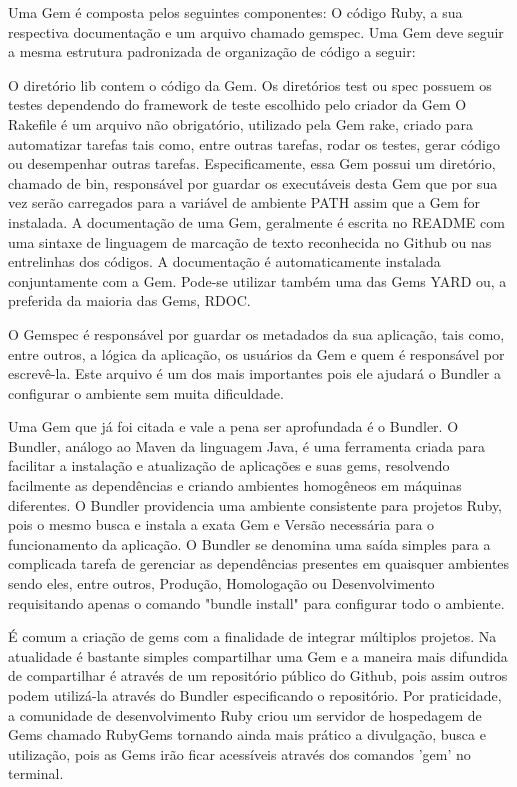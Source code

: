 Uma Gem é composta pelos seguintes componentes: O código Ruby, a sua respectiva documentação e um arquivo chamado gemspec. Uma Gem deve seguir a mesma estrutura padronizada de organização de código a seguir:



O diretório lib contem o código da Gem. Os diretórios test ou spec possuem os testes dependendo do framework de teste escolhido pelo criador da Gem
O Rakefile é um arquivo não obrigatório, utilizado pela Gem rake, criado para automatizar tarefas tais como, entre outras tarefas, rodar os testes, gerar código ou desempenhar outras tarefas. Especificamente, essa Gem possui um diretório, chamado de bin, responsável por guardar os executáveis desta Gem que por sua vez serão carregados para a variável de ambiente PATH assim que a Gem for instalada. A documentação de uma Gem, geralmente é escrita no README com uma sintaxe de linguagem de marcação de texto reconhecida no Github ou nas entrelinhas dos códigos. A documentação é automaticamente instalada conjuntamente com a Gem. Pode-se utilizar também uma das Gems YARD ou, a preferida da maioria das Gems, RDOC.

	O Gemspec é responsável por guardar os metadados da sua aplicação, tais como, entre outros, a lógica da aplicação, os usuários da Gem e quem é responsável por escrevê-la. Este arquivo é um dos mais importantes pois ele ajudará o Bundler a configurar o ambiente sem muita dificuldade.

Uma Gem que já foi citada e vale a pena ser aprofundada é o Bundler. O Bundler, análogo ao Maven da linguagem Java, é uma ferramenta criada para facilitar a instalação e atualização de aplicações e suas gems, resolvendo facilmente as dependências e criando ambientes homogêneos em máquinas diferentes. O Bundler providencia uma ambiente consistente para projetos Ruby, pois o mesmo busca e instala a exata Gem e Versão necessária para o funcionamento da aplicação. O Bundler se denomina uma saída simples para a complicada tarefa de gerenciar as dependências presentes em quaisquer ambientes sendo eles, entre outros, Produção, Homologação ou Desenvolvimento requisitando apenas o comando "bundle install" para configurar todo o ambiente.

É comum a criação de gems com a finalidade de integrar múltiplos projetos. Na atualidade é bastante simples compartilhar uma Gem e a maneira mais difundida de compartilhar é através de um repositório público do Github, pois assim outros podem utilizá-la através do Bundler especificando o repositório. Por praticidade, a comunidade de desenvolvimento Ruby criou um servidor de hospedagem de Gems chamado RubyGems tornando ainda mais prático a divulgação, busca e utilização, pois as Gems irão ficar acessíveis através dos comandos 'gem' no terminal.

